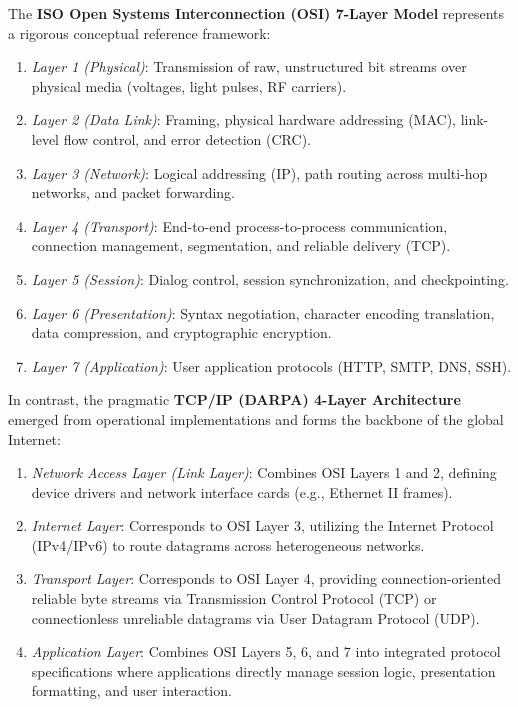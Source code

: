 \documentclass[10pt,twocolumn]{article}
\begin{document}
The \textbf{ISO Open Systems Interconnection (OSI) 7-Layer Model} represents a rigorous conceptual reference framework:
\begin{enumerate}
    \item \textit{Layer 1 (Physical)}: Transmission of raw, unstructured bit streams over physical media (voltages, light pulses, RF carriers).
    \item \textit{Layer 2 (Data Link)}: Framing, physical hardware addressing (MAC), link-level flow control, and error detection (CRC).
    \item \textit{Layer 3 (Network)}: Logical addressing (IP), path routing across multi-hop networks, and packet forwarding.
    \item \textit{Layer 4 (Transport)}: End-to-end process-to-process communication, connection management, segmentation, and reliable delivery (TCP).
    \item \textit{Layer 5 (Session)}: Dialog control, session synchronization, and checkpointing.
    \item \textit{Layer 6 (Presentation)}: Syntax negotiation, character encoding translation, data compression, and cryptographic encryption.
    \item \textit{Layer 7 (Application)}: User application protocols (HTTP, SMTP, DNS, SSH).
\end{enumerate}

In contrast, the pragmatic \textbf{TCP/IP (DARPA) 4-Layer Architecture} emerged from operational implementations and forms the backbone of the global Internet:
\begin{enumerate}
    \item \textit{Network Access Layer (Link Layer)}: Combines OSI Layers 1 and 2, defining device drivers and network interface cards (e.g., Ethernet II frames).
    \item \textit{Internet Layer}: Corresponds to OSI Layer 3, utilizing the Internet Protocol (IPv4/IPv6) to route datagrams across heterogeneous networks.
    \item \textit{Transport Layer}: Corresponds to OSI Layer 4, providing connection-oriented reliable byte streams via Transmission Control Protocol (TCP) or connectionless unreliable datagrams via User Datagram Protocol (UDP).
    \item \textit{Application Layer}: Combines OSI Layers 5, 6, and 7 into integrated protocol specifications where applications directly manage session logic, presentation formatting, and user interaction.
\end{enumerate}
\end{document}
